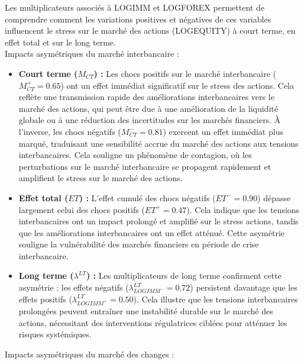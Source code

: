 Les multiplicateurs associés à LOGIMM et LOGFOREX permettent de comprendre comment les variations positives et négatives de ces variables influencent le stress sur le marché des actions (LOGEQUITY) à court terme, en effet total et sur le long terme.\\

Impacts asymétriques du marché interbancaire :\\

\begin{itemize}
    \item \textbf{Court terme (\(M_{CT}\)) :} 
    Les chocs positifs sur le marché interbancaire (\(M_{CT}^+ = 0.65\)) ont un effet immédiat significatif sur le stress des actions. Cela reflète une transmission rapide des améliorations interbancaires vers le marché des actions, qui peut être due à une amélioration de la liquidité globale ou à une réduction des incertitudes sur les marchés financiers.  
    À l’inverse, les chocs négatifs (\(M_{CT}^- = 0.81\)) exercent un effet immédiat plus marqué, traduisant une sensibilité accrue du marché des actions aux tensions interbancaires. Cela souligne un phénomène de contagion, où les perturbations sur le marché interbancaire se propagent rapidement et amplifient le stress sur le marché des actions.

    \item \textbf{Effet total (\(ET\)) :} 
    L’effet cumulé des chocs négatifs (\(ET^- = 0.90\)) dépasse largement celui des chocs positifs (\(ET^+ = 0.47\)). Cela indique que les tensions interbancaires ont un impact prolongé et amplifié sur le stress actions, tandis que les améliorations interbancaires ont un effet atténué. Cette asymétrie souligne la vulnérabilité des marchés financiers en période de crise interbancaire.

    \item \textbf{Long terme (\(\lambda^{LT}\)) :} 
    Les multiplicateurs de long terme confirment cette asymétrie : les effets négatifs (\(\lambda^{LT}_{LOGIMM^-} = 0.72\)) persistent davantage que les effets positifs (\(\lambda^{LT}_{LOGIMM^+} = 0.50\)). Cela illustre que les tensions interbancaires prolongées peuvent entraîner une instabilité durable sur le marché des actions, nécessitant des interventions régulatrices ciblées pour atténuer les risques systémiques.
\end{itemize}

Impacts asymétriques du marché des changes :\\

